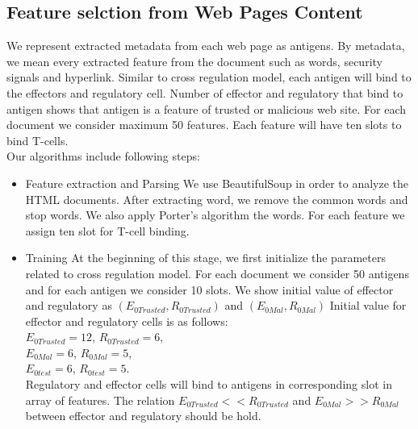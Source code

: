\documentclass{llncs}
\begin{document}
\subsection{Feature selction from Web Pages Content}
We represent extracted metadata from each web page as antigens. By metadata, we mean every extracted feature from the document such as words, security signals and hyperlink. Similar to cross regulation model, each antigen will bind to the effectors and regulatory cell. Number of effector and regulatory that bind to antigen shows that antigen is a feature of trusted or malicious web site.
For each document we consider maximum 50 features. Each feature will have ten slots to bind T-cells. \\
Our algorithms include following steps: 
\begin{itemize}
\item Feature extraction and Parsing
We use BeautifulSoup in order to analyze the HTML documents.  After extracting word, we remove the common words and stop words.  We also apply  Porter’s algorithm the words. For each feature we assign ten slot for T-cell binding.
\item Training 
At the beginning of this stage, we first initialize the parameters related to cross regulation model. For each document we consider 50 antigens and for each antigen we consider 10 slots. We show initial value of  effector and regulatory as $(E_{0Trusted}, R_{0Trusted })$ and $ (E_{0Mal}, R_{0Mal})$  Initial value for effector and regulatory cells is as follows:\\
$E_{0Trusted} =12$, $R_{0Trusted }=6$,\\ 
$E_{0Mal} =6$, $R_{0Mal }=5$, \\
$E_{0test} =6$, $R_{0test }=5$.\\
Regulatory and effector cells will bind to antigens in corresponding slot in array of features.  The relation $E_{0Trusted}<<R_{0Trusted}$ and $ E_{0Mal}>> R_{0Mal}$  between effector and regulatory should be hold.\\


\end{itemize}
\end{document}

